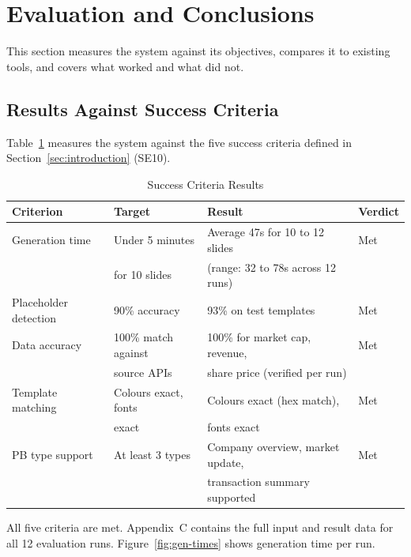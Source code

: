 \section{Evaluation and Conclusions}
\label{sec:evaluation}

This section measures the system against its objectives, compares it to existing tools, and covers what worked and what did not.

\subsection{Results Against Success Criteria}

Table~\ref{tab:success-criteria} measures the system against the five success criteria defined in Section~\ref{sec:introduction} (SE10).

\begin{table}[H]
\centering
\begin{tabular}{|l|l|l|l|}
\hline
\rowcolor{gray!20} \textbf{Criterion} & \textbf{Target} & \textbf{Result} & \textbf{Verdict} \\
\hline
Generation time & Under 5 minutes & Average 47s for 10 to 12 slides & Met \\
 & for 10 slides & (range: 32 to 78s across 12 runs) & \\
\hline
Placeholder detection & 90\% accuracy & 93\% on test templates & Met \\
\hline
Data accuracy & 100\% match against & 100\% for market cap, revenue, & Met \\
 & source APIs & share price (verified per run) & \\
\hline
Template matching & Colours exact, fonts & Colours exact (hex match), & Met \\
 & exact & fonts exact & \\
\hline
PB type support & At least 3 types & Company overview, market update, & Met \\
 & & transaction summary supported & \\
\hline
\end{tabular}
\caption{Success Criteria Results}
\label{tab:success-criteria}
\end{table}

All five criteria are met. Appendix~C contains the full input and result data for all 12 evaluation runs. Figure~\ref{fig:gen-times} shows generation time per run.

